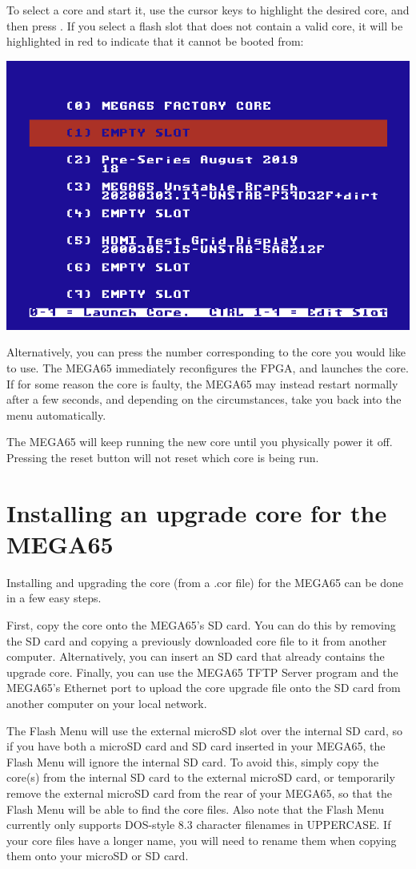 To select a core and start it, use the cursor keys to highlight the desired core, and then press
.  If you select a flash slot that does not
contain a valid core, it will be highlighted in red to indicate that it
cannot be booted from:

\begin{center}
\includegraphics[trim= 0  0 0 10mm,clip,width=0.7\linewidth]{images/ss-flashmenu-invalidslot.png}
\end{center}

Alternatively, you can press the number corresponding to the core you would
like to use. The MEGA65 immediately reconfigures the FPGA, and launches the core.  If for some reason
the core is faulty, the MEGA65 may instead restart normally after a few seconds, and depending on the
circumstances, take you back into the menu automatically.

The MEGA65 will keep running the new core until you physically power it off.  Pressing the reset button
will not reset which core is being run.

\section{Installing an upgrade core for the MEGA65}

Installing and upgrading the core (from a .cor file) for the MEGA65 can be done in a few easy steps.

First, copy the core onto the MEGA65's SD card. You can do this by removing the SD card and copying a previously
downloaded core file to it from another computer. Alternatively,
you can insert an SD card that already contains the upgrade core. Finally, you can use the MEGA65 TFTP Server
program and the MEGA65's Ethernet port to upload the core upgrade file onto the SD card from another computer
on your local network.

The Flash Menu will use the external microSD slot over
the internal SD card, so if you have both a microSD card and SD card
inserted in your MEGA65, the Flash Menu will ignore the
internal SD card. To avoid this, simply copy the core(s) from the internal SD
card to the external microSD card, or temporarily remove the external
microSD card from the rear of your MEGA65, so that the Flash Menu will
be able to find the core files.  Also note that the Flash Menu
currently only supports DOS-style 8.3 character filenames in UPPERCASE. If your
core files have a longer name, you will need to rename them when
copying them onto your microSD or SD card.

